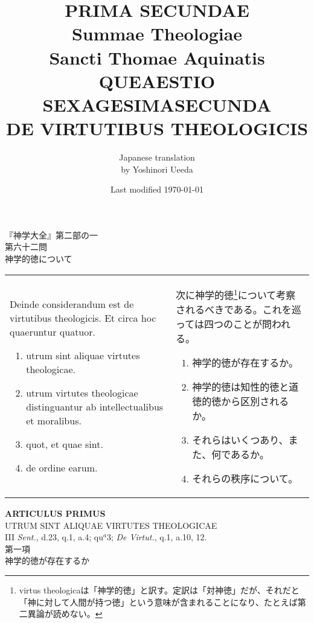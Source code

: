 \documentclass[10pt]{jsarticle}
\title{{\bf PRIMA SECUNDAE}\\{\HUGE Summae Theologiae}\\Sancti Thomae
Aquinatis\\{\sffamily QUEAESTIO SEXAGESIMASECUNDA}\\DE VIRTUTIBUS THEOLOGICIS}
\author{Japanese translation\\by Yoshinori {\sc Ueeda}}
\date{Last modified \today}
\begin{document}
\maketitle
\thispagestyle{empty}

\begin{center}
{\LARGE 『神学大全』第二部の一}\\
{\Large 第六十二問\\神学的徳について}
\end{center}

\begin{longtable}{p{21em}p{21em}}

Deinde considerandum est de virtutibus theologicis. Et circa hoc quaeruntur quatuor. 

\begin{enumerate}
 \item utrum sint aliquae virtutes theologicae.
 \item utrum virtutes theologicae distinguantur ab intellectualibus et moralibus.
 \item quot, et quae sint.
 \item de ordine earum.
\end{enumerate}

&

 次に神学的徳\footnote{virtus theologicaは「神学的徳」と訳す。定訳は「対神徳」だが、それだと「神に対して人間が持つ徳」という意味が含まれることになり、たとえば第二異論が読めない。}について考察されるべきである。これを巡っては四つのことが問われる。  

\begin{enumerate}
 \item 神学的徳が存在するか。
 \item 神学的徳は知性的徳と道徳的徳から区別されるか。
 \item それらはいくつあり、また、何であるか。
 \item それらの秩序について。
\end{enumerate}
\end{longtable}

\newpage

\begin{center}
{\Large {\bf ARTICULUS PRIMUS}}\\
{\large UTRUM SINT ALIQUAE VIRTUTES THEOLOGICAE}\\
{\footnotesize III {\itshape Sent.}, d.23, q.1, a.4; qu$^{a}$3; {\itshape De Virtut.}, q.1, a.10, 12.}\\
{\Large 第一項\\神学的徳が存在するか}
\end{center}
\end{document}
